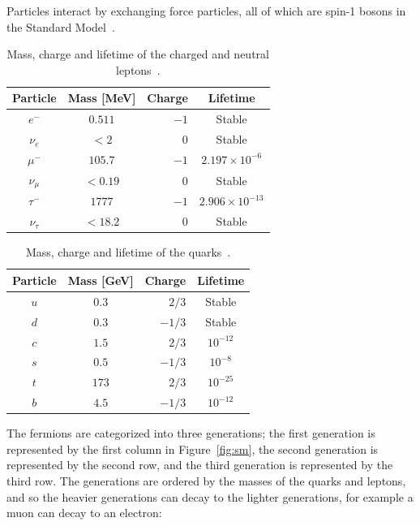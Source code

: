Particles interact by exchanging force particles, all of which are spin-1 bosons in the Standard Model~\cite{martin}.


\begin{table}
\begin{center}
\begin{tabular}{||c c r c||} 
 \hline
 Particle & Mass [MeV] & Charge & Lifetime \\ [0.5ex] 
 \hline\hline
 $e^{-}$ & $0.511$ & $-1$ & Stable \\ 
 \hline
 $\nu_e$ & $<2$ & $0$ & Stable \\
 \hline
 $\mu^{-}$ & $105.7$ & $-1$ & $2.197 \times 10^{-6}$ \\
 \hline
 $\nu_\mu$ & $<0.19$ & $0$ & Stable \\
 \hline
 $\tau^{-}$ & $1777$ & $-1$ & $2.906 \times 10^{-13}$  \\
 \hline
 $\nu_\tau$ & $<18.2$ & $0$ & Stable \\ [1ex] 
 \hline
\end{tabular}
\end{center}
\caption{Mass, charge and lifetime of the charged and neutral leptons~\cite{martin}.}
\label{tab:leptons}
\end{table}

\begin{table}
\begin{center}
\begin{tabular}{||c c r c||} 
 \hline
 Particle & Mass [GeV] & Charge & Lifetime \\ [0.5ex] 
 \hline\hline
 $u$ & $0.3$ & $2/3$ & Stable \\ 
 \hline
 $d$ & $0.3$ & $-1/3$ & Stable \\
 \hline
 $c$ & $1.5$ & $2/3$ & $10^{-12}$ \\
 \hline
 $s$ & $0.5$ & $-1/3$ & $10^{-8}$ \\
 \hline
 $t$ & $173$ & $2/3$ & $10^{-25}$  \\
 \hline
 $b$ & $4.5$ & $-1/3$ & $10^{-12}$ \\ [1ex] 
 \hline
\end{tabular}
\end{center}
\caption{Mass, charge and lifetime of the quarks~\cite{martin}.}
\label{tab:quarks}
\end{table}


The fermions are categorized into three generations; the first generation is represented by the first column in Figure~\ref{fig:sm}, the second generation is represented by the second row, and the third generation is represented by the third row. The generations are ordered by the masses of the quarks and leptons, and so the heavier generations can decay to the lighter generations, for example a muon can decay to an electron:

